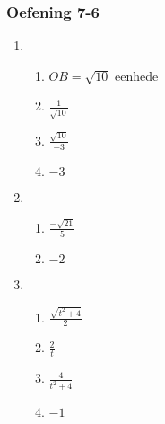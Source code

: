 {\begin{multicols}{3}
\subsubsection*{Oefening 7-6} %
  \begin{enumerate}[noitemsep, label=\textbf{\arabic*}. ]
   \item %
\begin{enumerate}[itemsep=1pt, label=\textbf{(\alph*)} ]
\item $OB=\sqrt{10}$ eenhede%
\item $\frac{1}{\sqrt{10}}$%
\item $\frac{\sqrt{10}}{-3}$%
\item $-3$%
\end{enumerate}


\item %

\begin{enumerate}[itemsep=1pt, label=\textbf{(\alph*)} ]
\item $\frac{-\sqrt{21}}{5}$%
\item $-2$%
\end{enumerate}

\item %
\begin{enumerate}[noitemsep, label=\textbf{(\alph*)} ]
\item $\frac{\sqrt{t^2+4}}{2}$%
\item $\frac{2}{t}$%
\item $\frac{4}{t^2+4}$%
\item $-1$%
\end{enumerate}


\end{enumerate}
\end{multicols}}
